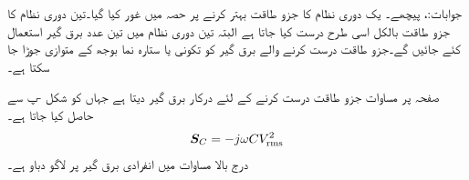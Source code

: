 جوابات:،  پیچھے۔
یک دوری نظام کا جزو طاقت بہتر کرنے پر  حصہ  میں غور کیا گیا۔تین دوری نظام کا جزو طاقت بالکل اسی طرح درست کیا جاتا ہے البتہ تین دوری نظام میں تین عدد برق گیر استعمال کئے جائیں گے۔جزو طاقت درست کرنے والے برق گیر کو تکونی یا ستارہ نما بوجھ کے متوازی جوڑا جا سکتا ہے۔

صفحہ  پر مساوات  جزو طاقت درست کرنے کے لئے درکار برق گیر دیتا ہے جہاں  کو شکل -پ سے حاصل کیا جاتا ہے۔
\begin{align*}
{\ensuremath{{\boldsymbol{S}}}}_C=-j \omega C {V^2_{\textup{rms}}}
\end{align*}
درج بالا مساوات میں  انفرادی برق گیر پر لاگو دباو ہے۔

